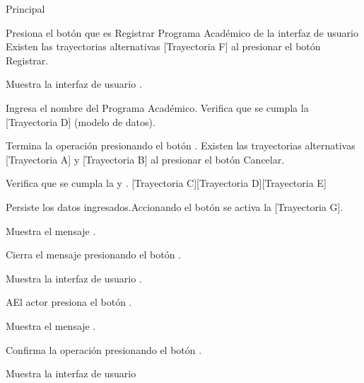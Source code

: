 \begin{UCtrayectoria}{Principal}

    \UCpaso[\UCactor] Presiona el botón \IUbutton{(+)} que es Registrar Programa Académico de la interfaz de usuario Existen las trayectorias alternativas [Trayectoria F] al presionar el botón Registrar.



    \UCpaso Muestra la interfaz de usuario .



    \UCpaso[\UCactor] Ingresa el nombre del Programa Académico. Verifica que se cumpla la [Trayectoria D] (modelo de datos).



    \UCpaso[\UCactor] Termina la operación presionando el botón . Existen las trayectorias alternativas [Trayectoria A] y [Trayectoria B] al presionar el botón Cancelar.



    \UCpaso Verifica que se cumpla la  y . [Trayectoria C][Trayectoria D][Trayectoria E]



    \UCpaso Persiste los datos ingresados.Accionando el botón  se activa la  [Trayectoria G].



    \UCpaso Muestra el mensaje .



    \UCpaso[\UCactor] Cierra el mensaje presionando el botón .

    \UCpaso Muestra la interfaz de usuario .

\end{UCtrayectoria}




\begin{UCtrayectoriaA}{A}{El actor presiona el botón .}

    \UCpaso Muestra el mensaje .

    \UCpaso[\UCactor] Confirma la operación presionando el botón .

    \UCpaso Muestra la interfaz de usuario 

\end{UCtrayectoriaA}


